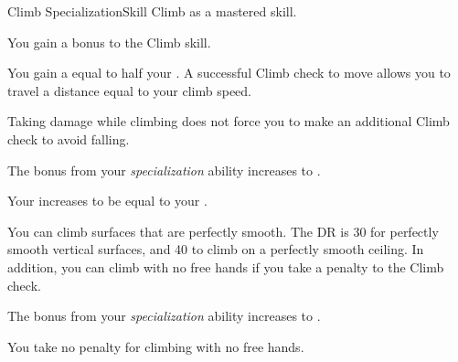     \begin{feat}{Climb Specialization}{Skill}
        \featpre Climb as a mastered skill.

         You gain a  bonus to the Climb skill.

         You gain a  equal to half your .
        A successful Climb check to move allows you to travel a distance equal to your climb speed.

         Taking damage while climbing does not force you to make an additional Climb check to avoid falling.

         The bonus from your \textit{specialization} ability increases to .

         Your  increases to be equal to your .

         You can climb surfaces that are perfectly smooth.
        The DR is 30 for perfectly smooth vertical surfaces, and 40 to climb on a perfectly smooth ceiling.
        In addition, you can climb with no free hands if you take a  penalty to the Climb check.

         The bonus from your \textit{specialization} ability increases to .

         You take no penalty for climbing with no free hands.
    \end{feat}

